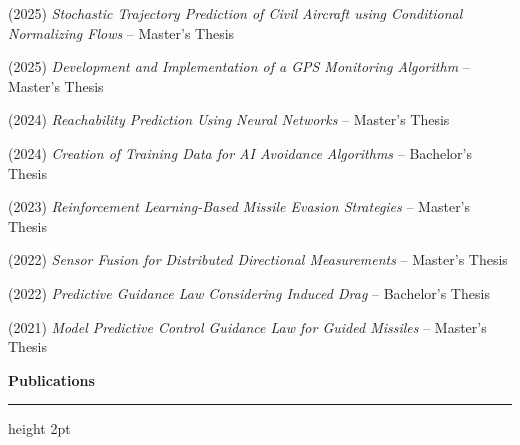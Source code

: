 \documentclass[11pt,a4paper]{article}
\newcommand{\sectiontitle}[1]{%
    \vspace{10pt}
    {\Large\bfseries\color{darkblue}#1}
    \nopagebreak
    \vspace{6pt}
    {\color{accentgreen}\hrule height 2pt}
    \vspace{8pt}
}
\begin{document}
\begin{enumerate}[label=\textbf{[\arabic*]}, leftmargin=0.8cm, itemsep=3pt]
    \item (2025) \textit{Stochastic Trajectory Prediction of Civil Aircraft using Conditional Normalizing Flows} -- Master's Thesis
    \item (2025) \textit{Development and Implementation of a GPS Monitoring Algorithm} -- Master's Thesis
    \item (2024) \textit{Reachability Prediction Using Neural Networks} -- Master's Thesis
    \item (2024) \textit{Creation of Training Data for AI Avoidance Algorithms} -- Bachelor's Thesis
    \item (2023) \textit{Reinforcement Learning-Based Missile Evasion Strategies} -- Master's Thesis
    \item (2022) \textit{Sensor Fusion for Distributed Directional Measurements} -- Master's Thesis
    \item (2022) \textit{Predictive Guidance Law Considering Induced Drag} -- Bachelor's Thesis
    \item (2021) \textit{Model Predictive Control Guidance Law for Guided Missiles} -- Master's Thesis
\end{enumerate}

\vspace{15pt}



\newpage
\sectiontitle{Publications}
\end{document}
